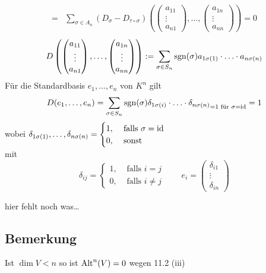 \begin{enumerate}[(i)]
\begin{align*}
		= & \sum\limits_{\sigma \in A_n} ( D_\sigma - D_{\tau \circ \sigma}) \left( \begin{pmatrix}
			a_{11} \\ \vdots \\ a_{n1}
		\end{pmatrix} , \ldots , \begin{pmatrix}
			a_{1n} \\ \vdots \\ a_{nn}
		\end{pmatrix} \right) = 0
	\end{align*}
	\[
		D \left( \begin{pmatrix}
			a_{11} \\ \vdots \\ a_{n1}
		\end{pmatrix} , \ldots , \begin{pmatrix}
			a_{1n} \\ \vdots \\ a_{nn}
		\end{pmatrix} \right) := \sum\limits_{\sigma \in S_n} \operatorname{sgn}(\sigma) a_{1 \sigma(1)} \cdot \ldots \cdot a_{n \sigma(n)}
	\]
	Für die Standardbasis $e_1, \ldots , e_n$ von $K^n$ gilt 
	\[
		D ( e_1, \ldots , e_n) = \sum\limits_{\sigma \in S_n} \operatorname{sgn}(\sigma) {\delta_{1 \sigma(i)} \cdot \ldots \cdot \delta_{n \sigma(n)}}_{= 1 \text{ für } \sigma = \operatorname{id}}
		 = 1
	\]
	wobei $\delta_{1 \sigma(1)}, \ldots , \delta_{n \sigma(n)} = \begin{cases}
		1, &\text{ falls } \sigma = \operatorname{id} \\
		0, &\text{ sonst}
	\end{cases}$ \\
	mit
	\[
		\delta_{ij} = \begin{cases}
			1, &\text{ falls } i=j\\
			0 , &\text{ falls } i \not= j
			
		\end{cases} \qquad e_i = \begin{pmatrix}
			\delta_{i1} \\ \vdots \\ \delta_{in}
		\end{pmatrix}
	\]
	
	hier fehlt noch was…
\end{enumerate}

\subsection{Bemerkung} %
\label{sub:bemerkung}
Ist $\dim V < n $ so ist $\operatorname{Alt}^n (V) = 0$ wegen 11.2 (iii)

